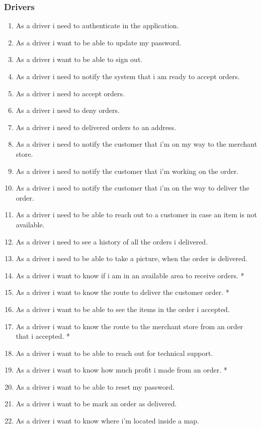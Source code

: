 \subsubsection{Drivers}
\begin{enumerate}[resume, label=USR-\arabic*]
    \item As a driver i need to authenticate in the application.
    \item As a driver i want to be able to update my password.
    \item As a driver i want to be able to sign out.
    \item As a driver i need to notify the system that i am ready to 
    accept orders.
    \item As a driver i need to accept orders.
    \item As a driver i need to deny orders.
    \item As a driver i need to delivered orders to an address.
    \item As a driver i need to notify the customer that i’m on my way to the 
    merchant store.
    \item As a driver i need to notify the customer that i’m working on the 
    order.
    \item As a driver i need to notify the customer that i’m on the way to 
    deliver the order.
    \item As a driver i need to be able to reach out to a customer in case an 
    item is not available.
    \item As a driver i need to see a history of all the orders i delivered.
    \item As a driver i need to be able to take a picture, when the order is 
    delivered.
    \item As a driver i want to know if i am in an available area to receive 
    orders. *
    \item As a driver i want to know the route to deliver the customer order. *
    \item As a driver i want to be able to see the items in the order i 
    accepted.
    \item As a driver i want to know the route to the merchant store from an 
    order that i accepted. *
    \item As a driver i want to be able to reach out for technical support.
    \item As a driver i want to know how much profit i made from an order. *
    \item As a driver i want to be able to reset my password.
    \item As a driver i want to be mark an order as delivered.
    \item As a driver i want to know where i'm located inside a map.
\end{enumerate}
\pagebreak

